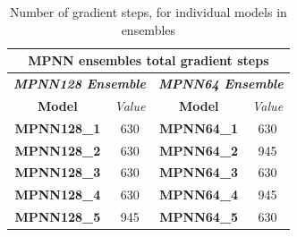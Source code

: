 \begin{table}[H]
    \centering
    \caption{Number of gradient steps, for individual models in ensembles}
    \label{tab:num-steps}
    \begin{tabular}{|cccc|}
    \hline
    \multicolumn{4}{|c|}{\textbf{MPNN ensembles total gradient steps}}                                                                         \\ \hline
    \multicolumn{2}{|c|}{\textit{\textbf{MPNN128 Ensemble}}}                        & \multicolumn{2}{c|}{\textit{\textbf{MPNN64 Ensemble}}}   \\ \hline
    \multicolumn{1}{|c|}{\textbf{Model}}      & \multicolumn{1}{c|}{\textit{Value}} & \multicolumn{1}{c|}{\textbf{Model}}     & \textit{Value} \\ \hline
    \multicolumn{1}{|c|}{\textbf{MPNN128\_1}} & \multicolumn{1}{c|}{630}            & \multicolumn{1}{c|}{\textbf{MPNN64\_1}} & 630            \\ \hline
    \multicolumn{1}{|c|}{\textbf{MPNN128\_2}} & \multicolumn{1}{c|}{630}            & \multicolumn{1}{c|}{\textbf{MPNN64\_2}} & 945            \\ \hline
    \multicolumn{1}{|c|}{\textbf{MPNN128\_3}} & \multicolumn{1}{c|}{630}            & \multicolumn{1}{c|}{\textbf{MPNN64\_3}} & 630            \\ \hline
    \multicolumn{1}{|c|}{\textbf{MPNN128\_4}} & \multicolumn{1}{c|}{630}            & \multicolumn{1}{c|}{\textbf{MPNN64\_4}} & 945            \\ \hline
    \multicolumn{1}{|c|}{\textbf{MPNN128\_5}} & \multicolumn{1}{c|}{945}            & \multicolumn{1}{c|}{\textbf{MPNN64\_5}} & 630            \\ \hline
    \end{tabular}
    \end{table}

